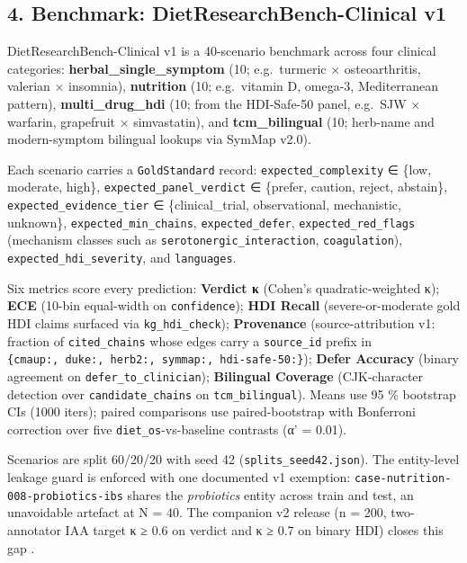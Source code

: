 \documentclass[
]{article}
\begin{document}
\hypertarget{benchmark-dietresearchbench-clinical-v1}{%
\subsection{4. Benchmark: DietResearchBench-Clinical
v1}\label{benchmark-dietresearchbench-clinical-v1}}

DietResearchBench-Clinical v1 is a 40-scenario benchmark across four
clinical categories: \textbf{herbal\_single\_symptom} (10; e.g.~turmeric
× osteoarthritis, valerian × insomnia), \textbf{nutrition} (10;
e.g.~vitamin D, omega-3, Mediterranean pattern),
\textbf{multi\_drug\_hdi} (10; from the HDI-Safe-50 panel, e.g.~SJW ×
warfarin, grapefruit × simvastatin), and \textbf{tcm\_bilingual} (10;
herb-name and modern-symptom bilingual lookups via SymMap v2.0).

Each scenario carries a \texttt{GoldStandard} record:
\texttt{expected\_complexity} ∈ \{low, moderate, high\},
\texttt{expected\_panel\_verdict} ∈ \{prefer, caution, reject,
abstain\}, \texttt{expected\_evidence\_tier} ∈ \{clinical\_trial,
observational, mechanistic, unknown\}, \texttt{expected\_min\_chains},
\texttt{expected\_defer}, \texttt{expected\_red\_flags} (mechanism
classes such as \texttt{serotonergic\_interaction},
\texttt{coagulation}), \texttt{expected\_hdi\_severity}, and
\texttt{languages}.

Six metrics score every prediction: \textbf{Verdict κ} (Cohen's
quadratic-weighted κ); \textbf{ECE} (10-bin equal-width on
\texttt{confidence}); \textbf{HDI Recall} (severe-or-moderate gold HDI
claims surfaced via \texttt{kg\_hdi\_check}); \textbf{Provenance}
(source-attribution v1: fraction of \texttt{cited\_chains} whose edges
carry a \texttt{source\_id} prefix in
\texttt{\{cmaup:,\ duke:,\ herb2:,\ symmap:,\ hdi-safe-50:\}});
\textbf{Defer Accuracy} (binary agreement on
\texttt{defer\_to\_clinician}); \textbf{Bilingual Coverage}
(CJK-character detection over \texttt{candidate\_chains} on
\texttt{tcm\_bilingual}). Means use 95 \% bootstrap CIs (1000 iters);
paired comparisons use paired-bootstrap with Bonferroni correction over
five \texttt{diet\_os}-vs-baseline contrasts (α' = 0.01).

Scenarios are split 60/20/20 with seed 42
(\texttt{splits\_seed42.json}). The entity-level leakage guard is
enforced with one documented v1 exemption:
\texttt{case-nutrition-008-probiotics-ibs} shares the \emph{probiotics}
entity across train and test, an unavoidable artefact at N = 40. The
companion v2 release (n = 200, two-annotator IAA target κ ≥ 0.6 on
verdict and κ ≥ 0.7 on binary HDI) closes this gap
\citep{v2benchmark2026}.
\end{document}
